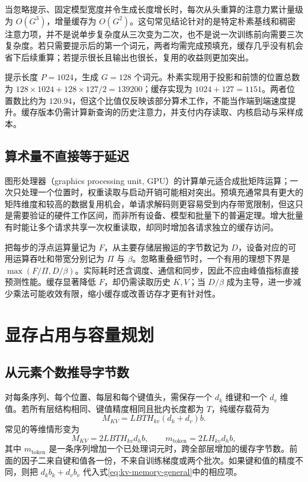 \documentclass[UTF8,12pt,a4paper,fontset=fandol]{ctexart}
\begin{document}
当忽略提示、固定模型宽度并令生成长度增长时，每次从头重算的注意力累计量级为 $O(G^3)$，增量缓存为 $O(G^2)$。这句常见结论针对的是特定朴素基线和稠密注意力项，并不是说单步复杂度从三次变为二次，也不是说一次训练前向需要三次复杂度。若只需要提示后的第一个词元，两者均需完成预填充，缓存几乎没有机会省下后续重算；若提示很长且输出也很长，复用的收益则更加突出。

\begin{example}[统计实际处理了多少个位置]
提示长度 $P=1024$，生成 $G=128$ 个词元。朴素实现用于投影和前馈的位置总数为 $128\times1024+128\times127/2=139200$；缓存实现为 $1024+127=1151$。两者位置数比约为 $120.94$，但这个比值仅反映该部分算术工作，不能当作端到端速度提升。缓存版本仍需计算新查询的历史注意力，并支付内存读取、内核启动与采样成本。
\end{example}

\subsection{算术量不直接等于延迟}

图形处理器（graphics processing unit, GPU）的计算单元适合成批矩阵运算；一次只处理一个位置时，权重读取与启动开销可能相对突出。预填充通常具有更大的矩阵维度和较高的数据复用机会，单请求解码则更容易受到内存带宽限制，但这只是需要验证的硬件工作区间，而非所有设备、模型和批量下的普遍定理。增大批量有时能让多个请求共享一次权重读取，却同时增加各请求独立的缓存访问。

把每步的浮点运算量记为 $F$，从主要存储层搬运的字节数记为 $D$，设备对应的可用运算吞吐和带宽分别记为 $\Pi$ 与 $\beta$。忽略重叠细节时，一个有用的理想下界是 $\max(F/\Pi,D/\beta)$。实际耗时还含调度、通信和同步，因此不应由峰值指标直接预测性能。缓存显著降低 $F$，却仍需读取历史 $K,V$；当 $D/\beta$ 成为主导，进一步减少乘法可能收效有限，缩小缓存或改善访存才更有针对性。

\section{显存占用与容量规划}
\label{sec:kv-memory}

\subsection{从元素个数推导字节数}

对每条序列、每个位置、每层和每个键值头，需保存一个 $d_k$ 维键和一个 $d_v$ 维值。若所有层结构相同、键值精度相同且批内长度都为 $T$，纯缓存载荷为
\begin{equation}
 M_{KV}=LBT H_{kv}(d_k+d_v)b.
 \label{eq:kv-memory-general}
\end{equation}
常见的等维情形变为
\begin{equation}
 M_{KV}=2LBT H_{kv}d_hb,
 \qquad m_{\mathrm{token}}=2LH_{kv}d_hb,
 \label{eq:kv-memory-equal}
\end{equation}
其中 $m_{\mathrm{token}}$ 是一条序列增加一个已处理词元时，跨全部层增加的缓存字节数。前面的因子二来自键和值各一份，不来自训练梯度或两个批次。如果键和值的精度不同，则把 $d_kb_k+d_vb_v$ 代入式\eqref{eq:kv-memory-general}中的相应项。
\end{document}
